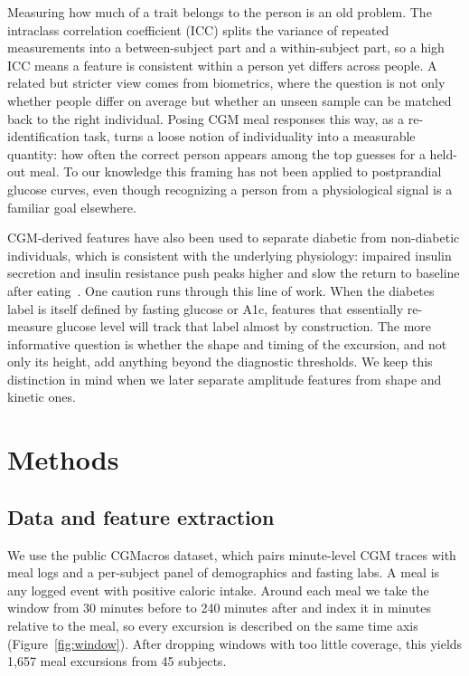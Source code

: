 \documentclass[10pt,conference,compsoc]{IEEEtran}
\begin{document}
Measuring how much of a trait belongs to the person is an old problem. The
intraclass correlation coefficient (ICC) splits the variance of repeated
measurements into a between-subject part and a within-subject part, so a high ICC
means a feature is consistent within a person yet differs across people. A
related but stricter view comes from biometrics, where the question is not only
whether people differ on average but whether an unseen sample can be matched back
to the right individual. Posing CGM meal responses this way, as a
re-identification task, turns a loose notion of individuality into a measurable
quantity: how often the correct person appears among the top guesses for a
held-out meal. To our knowledge this framing has not been applied to postprandial
glucose curves, even though recognizing a person from a physiological signal is a
familiar goal elsewhere.

CGM-derived features have also been used to separate diabetic from non-diabetic
individuals, which is consistent with the underlying physiology: impaired insulin
secretion and insulin resistance push peaks higher and slow the return to
baseline after eating~\cite{defronzo2004}. One caution runs through this line of
work. When the diabetes label is itself defined by fasting glucose or A1c,
features that essentially re-measure glucose level will track that label almost by
construction. The more informative question is whether the shape and timing of the
excursion, and not only its height, add anything beyond the diagnostic
thresholds. We keep this distinction in mind when we later separate amplitude
features from shape and kinetic ones.

\section{Methods}

\subsection{Data and feature extraction}
We use the public CGMacros dataset, which pairs minute-level CGM traces with meal
logs and a per-subject panel of demographics and fasting labs. A meal is any
logged event with positive caloric intake. Around each meal we take the window
from 30 minutes before to 240 minutes after and index it in minutes relative to
the meal, so every excursion is described on the same time axis
(Figure~\ref{fig:window}). After dropping windows with too little coverage, this
yields 1{,}657 meal excursions from 45 subjects.
\end{document}
